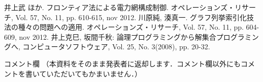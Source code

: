\documentclass[a4j,10pt,dvipdfmx]{jarticle}
\begin{document}
\begin{multicols}{1}
\begin{thebibliography}{10}
\small
\setlength{\itemsep}{-2pt} %
 井上武 ほか. フロンティア法による電力網構成制御. 
		 オペレーションズ・リサーチ, Vol. 57, No. 11, pp. 610-615, nov 2012.
 川原純, 湊真一. グラフ列挙索引化技法の種々の問題への適用. 
		 オペレーションズ・リサーチ, Vol. 57, No. 11, pp. 604-609, nov 2012. 
 井上克巳, 坂間千秋: 論理プログラミングから解集合プログラミングへ, 
		 コンピュータソフトウェア, Vol. 25, No. 3(2008), pp. 20-32.
\end{thebibliography}

\end{multicols}
\vfill
\noindent
{\gt コメント欄}
{\footnotesize
（本資料をそのまま発表者に返却します．コメント欄以外にもコメントを書いていただいてもかまいません．）}
\\
\fbox{\begin{minipage}{\textwidth}\noindent\\\\\end{minipage}}	
\end{document}
